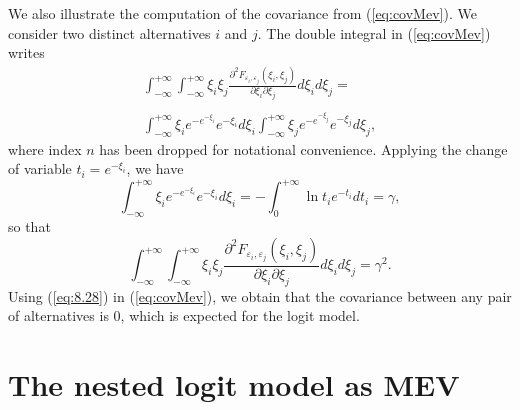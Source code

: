 \documentclass[12pt,a4paper]{article}
\newcommand{\req}[1]{(\ref{#1})}
\begin{document}
We also illustrate the computation of the covariance from \req{eq:covMev}. We consider two distinct alternatives $i$ and $j$. The double integral in \req{eq:covMev} writes
\[
\begin{array}{l}
\displaystyle \int_{-\infty}^{+\infty} \int_{-\infty}^{+\infty}\xi_i \xi_j \frac{\partial^2 F_{\varepsilon_i,\varepsilon_j} (\xi_i,\xi_j)}{\partial \xi_i \partial \xi_j } d\xi_i d\xi_j = \\ \\
\displaystyle \int_{-\infty}^{+\infty} \xi_i e^{-e^{-\xi_i}} e^{-\xi_i} d\xi_i\int_{-\infty}^{+\infty}\xi_j  e^{-e^{-\xi_j}}e^{-\xi_j} d\xi_j,
\end{array}
\]
where index $n$ has been dropped for notational convenience.
Applying the change of variable   $t_i=e^{-\xi_i}$, we have
\[
 \int_{-\infty}^{+\infty} \xi_i e^{-e^{-\xi_i}} e^{-\xi_i} d\xi_i = -\int_0^{+\infty} \ln t_i e^{-t_i} dt_i = \gamma,
\]
so that 
\begin{equation}
\label{eq:8.28}
\int_{-\infty}^{+\infty} \int_{-\infty}^{+\infty}\xi_i \xi_j \frac{\partial^2 F_{\varepsilon_i,\varepsilon_j} (\xi_i,\xi_j)}{\partial \xi_i \partial \xi_j } d\xi_i d\xi_j = \gamma^2.
\end{equation}
 Using \req{eq:8.28} in \req{eq:covMev}, we obtain that the covariance between any pair of alternatives is 0, which is expected for the logit model.


\section{The nested logit model as  MEV}
\label{sec:9-mevNL}
\end{document}
